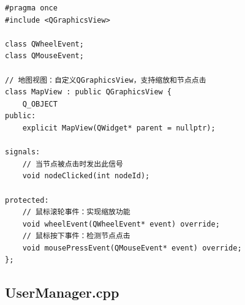 \documentclass[UTF8,12pt,a4paper]{ctexart}
\begin{document}
\begin{lstlisting}[caption={MapView.h 源码}]
#pragma once
#include <QGraphicsView>

class QWheelEvent;
class QMouseEvent;

// 地图视图：自定义QGraphicsView，支持缩放和节点点击
class MapView : public QGraphicsView {
    Q_OBJECT
public:
    explicit MapView(QWidget* parent = nullptr);

signals:
    // 当节点被点击时发出此信号
    void nodeClicked(int nodeId);

protected:
    // 鼠标滚轮事件：实现缩放功能
    void wheelEvent(QWheelEvent* event) override;
    // 鼠标按下事件：检测节点点击
    void mousePressEvent(QMouseEvent* event) override;
};

\end{lstlisting}

\subsection{UserManager.cpp}
\end{document}

